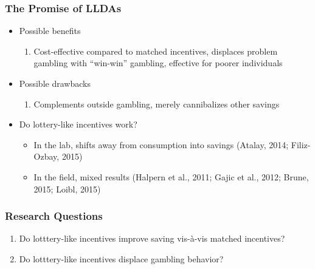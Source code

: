 \documentclass{beamer}
\begin{document}
\begin{frame} \frametitle{The Promise of LLDAs} \pause
	\begin{itemize} 
	\item Possible benefits \pause
		\begin{enumerate}
		\item Cost-effective compared to matched incentives, displaces problem gambling with ``win-win'' gambling, effective for poorer individuals \pause
		\end{enumerate}
	\item Possible drawbacks \pause
		\begin{enumerate}
		\item Complements outside gambling, merely cannibalizes other savings \pause
		\end{enumerate}
	\item Do lottery-like incentives work? \pause 
		\begin{itemize}
		\item In the lab, shifts away from consumption into savings (Atalay, 2014; Filiz-Ozbay, 2015) \pause
		\item In the field, mixed results (Halpern et al., 2011; Gajic et al., 2012; Brune, 2015; Loibl, 2015) \pause
		\end{itemize}
	\end{itemize}

\end{frame}


\begin{frame} \frametitle{Research Questions} \pause
	
	\begin{enumerate}
	\item Do lotttery-like incentives improve saving vis-\`{a}-vis matched incentives? \pause
	\item Do lotttery-like incentives displace gambling behavior? \pause
	\end{enumerate}

\end{frame}
\end{document}
